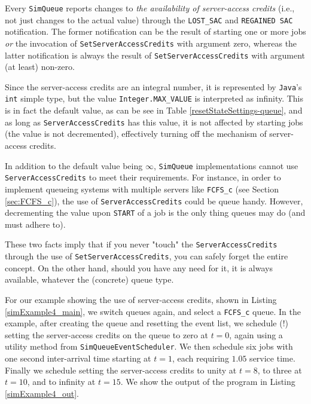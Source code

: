 Every \lstinline|SimQueue| reports
  changes to {\em the availability of server-access credits\/}
  (i.e., not just changes to the actual value)
  through the \lstinline|LOST_SAC|
  and \lstinline|REGAINED SAC|
  notification.
The former notification can be the result of
  starting one or more jobs
  {\em or\/}
  the invocation of \lstinline|SetServerAccessCredits|
  with argument zero,
  whereas the latter notification is always
  the result of \lstinline|SetServerAccessCredits|
  with argument (at least) non-zero.

Since the server-access credits are an integral number,
  it is represented by \lstinline|Java|'s
  \lstinline|int| simple type,
  but the value
  \lstinline|Integer.MAX_VALUE|
  is interpreted as infinity.
This is in fact the default value,
  as can be see in Table \ref{resetStateSettings-queue},
  and as long as \lstinline|ServerAccessCredits|
  has this value,
  it is not affected by starting jobs
  (the value is not decremented),
  effectively turning off the mechanism of
  server-access credits.

In addition to the default value being $\infty$,
  \lstinline|SimQueue| implementations
  cannot use \lstinline|ServerAccessCredits|
  to meet their requirements.
For instance, in order to implement queueing
  systems with multiple servers like
  \lstinline|FCFS_c|
  (see Section \ref{sec:FCFS_c}),
  the use of
  \lstinline|ServerAccessCredits|
  could be queue handy.
However, decrementing the value upon \lstinline|START|
  of a job is the only thing queues may do
  (and must adhere to).

These two facts imply that
  if you never "touch"
  the \lstinline|ServerAccessCredits|
  through the use of
  \lstinline|SetServerAccessCredits|,
  you can safely forget the entire concept.
On the other hand,
  should you have any need for it,
  it is always available,
  whatever the (concrete) queue type.

For our example showing the use of server-access credits,
  shown in Listing \ref{simExample4_main},
  we switch queues again,
  and select a \lstinline|FCFS_c| queue.
In the example, after creating the queue
  and resetting the event list,
  we schedule (!) setting the server-access credits
  on the queue to zero at $t=0$,
  again using a utility method
  from \lstinline|SimQueueEventScheduler|.
We then schedule six jobs
  with one second inter-arrival time
  starting at $t=1$,
  each requiring $1.05$ service time.
Finally we schedule setting the server-access credits
  to unity at $t=8$,
  to three at $t=10$,
  and to infinity at $t=15$.
We show the output of the program in
  Listing \ref{simExample4_out}.

